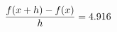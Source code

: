 \documentclass[preview]{standalone}
\begin{document}
\begin{align*}
\special{dvisvgm:raw <g id='unique000'>}\frac{f(x+h)-f(x)}{h} = 4.916\special{dvisvgm:raw </g>}
\end{align*}
\end{document}
